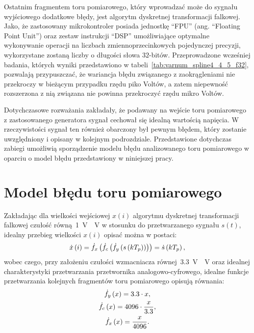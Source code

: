 Ostatnim fragmentem toru pomiarowego, który wprowadzać może do sygnału wyjściowego dodatkowe błędy, jest algorytm dyskretnej transformacji falkowej. Jako, że zastosowany mikrokontroler posiada jednostkę \enquote{FPU} (ang. \enquote{Floating Point Unit}) oraz zestaw instrukcji \enquote{DSP} umożliwiające optymalne wykonywanie operacji na liczbach zmiennoprzecinkowych pojedynczej precyzji, wykorzystane zostaną liczby o długości słowa $32$-bitów. Przeprowadzone wcześniej badania, których wyniki przedstawiono w tabeli~\ref{tab:varnum_spline4_4_5_f32}, pozwalają przypuszczać, że wariancja błędu związanego z zaokrągleniami nie przekroczy w bieżącym przypadku rzędu piko Voltów, a zatem niepewność rozszerzona z nią związana nie powinna przekroczyć rzędu mikro Voltów.

Dotychczasowe rozważania zakładały, że podawany na wejście toru pomiarowego z zastosowanego generatora sygnał cechował się idealną wartością napięcia. W rzeczywistości sygnał ten również obarczony był pewnym błędem, który zostanie uwzględniony i opisany w kolejnym podrozdziale. Przedstawione dotychczas zabiegi umożliwią sporządzenie modelu błędu analizowanego toru pomiarowego w oparciu o model błędu przedstawiony w niniejszej pracy.

\section{Model błędu toru pomiarowego}

Zakładając dla wielkości wejściowej $x(i)$ algorytmu dyskretnej transformacji falkowej czułość równą~\qty{1}{V \per V} w stosunku do przetwarzanego sygnału $s(t)$, idealny przebieg wielkości $x(i)$ opisać można w postaci:
\begin{equation}
\dot{x} \left(i\right) = \dot{f}_{x} \left( \dot{f}_{c} \left( \dot{f}_{y} \left( s \left(kT_{p}\right) \right) \right) \right) = \dot{s} \left(kT_{p}\right) \label{eq:pom_dwtina_ideal},
\end{equation}
wobec czego, przy założeniu czułości wzmacniacza równej~\qty{3.3}{V \per V} oraz idealnej charakterystyki przetwarzania przetwornika analogowo-cyfrowego, idealne funkcje przetwarzania kolejnych fragmentów toru pomiarowego opisują równania:
\begin{gather}
\dot{f}_{y} \left(x\right) = 3.3 \cdot x \label{eq:pom_ampfun_ideal}, \\
\dot{f}_{c} \left(x\right) = 4096 \cdot \frac{x}{3.3} \label{eq:pom_adcfun_ideal}, \\
\dot{f}_{x} \left(x\right) = \frac{x}{4096} \label{eq:pom_confun_ideal}.
\end{gather}

